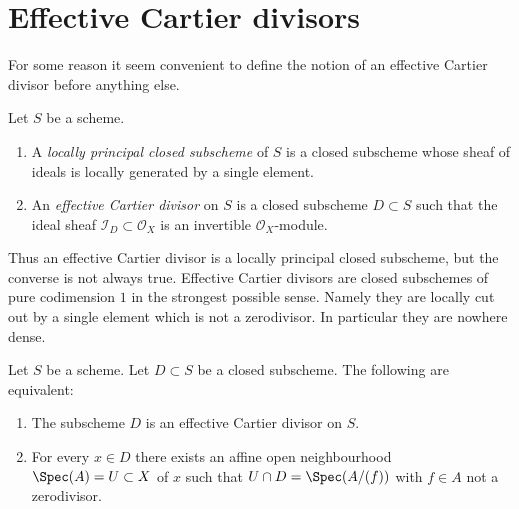 \section{Effective Cartier divisors}
\label{section-effective-Cartier-divisors}

\noindent
For some reason it seem convenient to define the notion of an effective
Cartier divisor before anything else.

\begin{definition}
\label{definition-effective-Cartier-divisor}
Let $S$ be a scheme.
\begin{enumerate}
\item A {\it locally principal closed subscheme} of $S$ is a closed subscheme
whose sheaf of ideals is locally generated by a single element.
\item An {\it effective Cartier divisor} on $S$ is a closed subscheme
$D \subset S$ such that the ideal sheaf $\mathcal{I}_D \subset \mathcal{O}_X$
is an invertible $\mathcal{O}_X$-module.
\end{enumerate}
\end{definition}

\noindent
Thus an effective Cartier divisor is a locally principal closed subscheme,
but the converse is not always true. Effective Cartier divisors are closed
subschemes of pure codimension $1$ in the strongest possible sense. Namely
they are locally cut out by a single element which is not a zerodivisor.
In particular they are nowhere dense.

\begin{lemma}
\label{lemma-characterize-effective-Cartier-divisor}
Let $S$ be a scheme.
Let $D \subset S$ be a closed subscheme.
The following are equivalent:
\begin{enumerate}
\item The subscheme $D$ is an effective Cartier divisor on $S$.
\item For every $x \in D$ there exists an affine open neighbourhood
$\Spec(A) = U \subset X$ of $x$ such that
$U \cap D = \Spec(A/(f))$ with $f \in A$ not a zerodivisor.
\end{enumerate}
\end{lemma}

